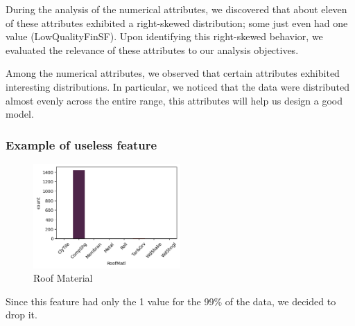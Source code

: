 During the analysis of the numerical attributes, we discovered that about eleven of these attributes exhibited a right-skewed distribution; some just even had one value (LowQualityFinSF). Upon identifying this right-skewed behavior, we evaluated the relevance of these attributes to our analysis objectives. 

Among the numerical attributes, we observed that certain attributes exhibited interesting distributions. 
In particular, we noticed that the data were distributed almost evenly across the entire range, this attributes will help us design a good model.
\newpage
\subsubsection*{Example of useless feature}
\begin{figure}[h!]
    \centering
    \includegraphics[width=0.5\textwidth]{imgs/roofMatl.png}
    \caption{Roof Material}
    \label{fig:roofmaterial}
\end{figure}

Since this feature had only the 1 value for the 99\% of the data, we decided to drop it.

